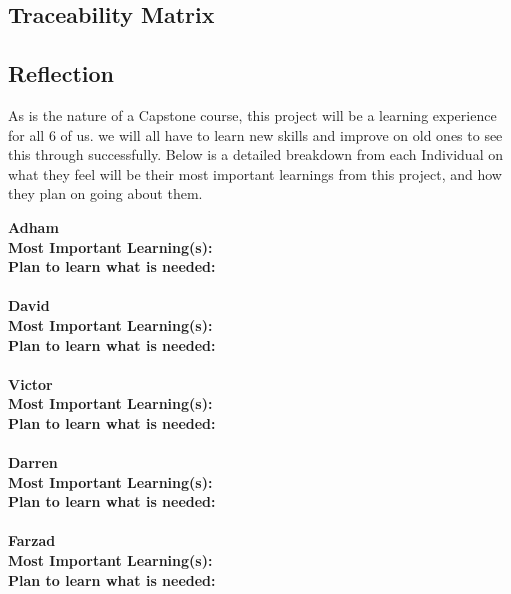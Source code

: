 \documentclass[12pt]{article}
\begin{document}
\subsection{Traceability Matrix}

\subsection{Reflection}

As is the nature of a Capstone course, this project will be a learning experience for all 6 of us. we will all have to learn new skills and improve on old ones to see this 
through successfully. Below is a detailed breakdown from each Individual on what they feel will be their most important learnings from this project, and how they plan on
going about them.

\noindent\textbf{Adham}\\
\textbf{Most Important Learning(s):}\\
\textbf{Plan to learn what is needed:}\\\\

\noindent\textbf{David}\\
\textbf{Most Important Learning(s):}\\
\textbf{Plan to learn what is needed:}\\\\

\noindent\textbf{Victor}\\
\textbf{Most Important Learning(s):}\\
\textbf{Plan to learn what is needed:}\\\\

\noindent\textbf{Darren}\\
\textbf{Most Important Learning(s):}\\
\textbf{Plan to learn what is needed:}\\\\

\noindent\textbf{Farzad}\\
\textbf{Most Important Learning(s):}\\
\textbf{Plan to learn what is needed:}\\\\
\end{document}
